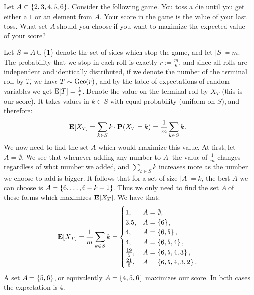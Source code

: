 \documentclass[11pt,a4paper]{article}
\begin{document}
\begin{exercise}
  \label{two-four}
  Let $A \subset \left\{2, 3, 4, 5, 6\right\}$.
  Consider the following game.
  You toss a die until you get either a $1$ or an element from $A$.
  Your score in the game is the value of your last toss.
  What set $A$ should you choose if you want to
  maximize the expected value of your score?
\end{exercise}
\begin{solution}
  Let $S = A \cup \left\{1\right\}$ denote the set of sides which stop the game,
  and let $|S| = m$.
  The probability that we stop in each roll is exactly
  $r := \frac{m}{6}$, and since all rolls are independent and identically
  distributed, if we denote the number of the terminal roll by $T$,
  we have $T \sim \operatorname{Geo}(r)$, and by the table of expectations of random
  variables we get $\mathbf{E}[T] = \frac{1}{r}$.
  Denote the value on the terminal roll by $X_T$ (this is our score).
  It takes values in $k \in S$ with equal probability (uniform on $S$),
  and therefore:
  \[
    \mathbf{E}[X_T] =
    \sum_{k \in S} k \cdot \mathbf{P}(X_T = k) =
    \frac{1}{m} \sum_{k \in S} k.
  \]
  We now need to find the set $A$ which would maximize this value.
  At first, let $A = \emptyset$.
  We see that whenever adding any number to $A$,
  the value of $\frac{1}{m}$ changes regardless of what number we added,
  and $\sum_{k \in S} k$ increases more as the number we choose to add is bigger.
  It follows that for a set of size $|A| = k$,
  the best $A$ we can choose is $A = \left\{6,\dots,6-k+1\right\}$.
  Thus we only need to find the set $A$ of these forms which maximizes $\mathbf{E}[X_T]$.
  We have that:
  \[
    \mathbf{E}[X_T] =
    \frac{1}{m} \sum_{k \in S} k =
    \begin{cases}
      1, &A = \emptyset, \\
      3.5, &A = \left\{6\right\}, \\
      4, &A = \left\{6,5\right\}, \\
      4, &A = \left\{6,5,4\right\}, \\
      \frac{19}{5}, &A = \left\{6,5,4,3\right\}, \\
      \frac{21}{6}, &A = \left\{6,5,4,3,2\right\}.
    \end{cases}
  \]
  A set $A = \left\{5,6\right\}$, or equivalently $A = \left\{4,5,6\right\}$
  maximizes our score.
  In both cases the expectation is $4$.
\end{solution}
\end{document}
